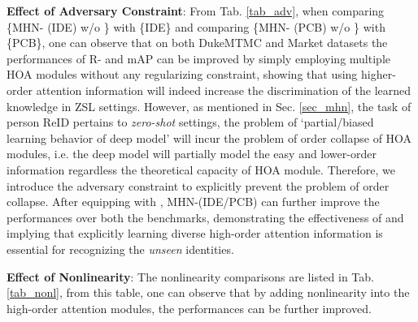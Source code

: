 \documentclass[10pt,twocolumn,letterpaper]{article}
\begin{document}
\begin{table}[t!]
      \vspace{-1.5em}
  \label{tab_adv}\end{table}\begin{table}[t!]
  \centering
      \caption{Effect (\%) of nonlinearity.}
      \vspace{-1.5em}
  \label{tab_nonl}\end{table}

\textbf{Effect of Adversary Constraint}: From Tab. \ref{tab_adv}, when comparing \{MHN- (IDE) w/o \} with \{IDE\} and comparing \{MHN- (PCB) w/o \} with \{PCB\}, one can observe that on both DukeMTMC and Market datasets the performances of R- and mAP can be improved by simply employing multiple HOA modules without any regularizing constraint, showing that using higher-order attention information will indeed increase the discrimination of the learned knowledge in ZSL settings. However, as mentioned in Sec. \ref{sec_mhn}, the task of person ReID pertains to \emph{zero-shot} settings, the problem of `partial/biased learning behavior of deep model' will incur the problem of order collapse of HOA modules, i.e. the deep model will partially model the easy and lower-order information regardless the theoretical capacity of HOA module. Therefore, we introduce the adversary constraint to explicitly prevent the problem of order collapse. After equipping with , MHN-(IDE/PCB) can further improve the performances over both the benchmarks, demonstrating the effectiveness of  and implying that explicitly learning diverse high-order attention information is essential for recognizing the \emph{unseen} identities.

\textbf{Effect of Nonlinearity}: The nonlinearity comparisons are listed in Tab. \ref{tab_nonl}, from this table, one can observe that by adding nonlinearity into the high-order attention modules, the performances can be further improved.
\end{document}
